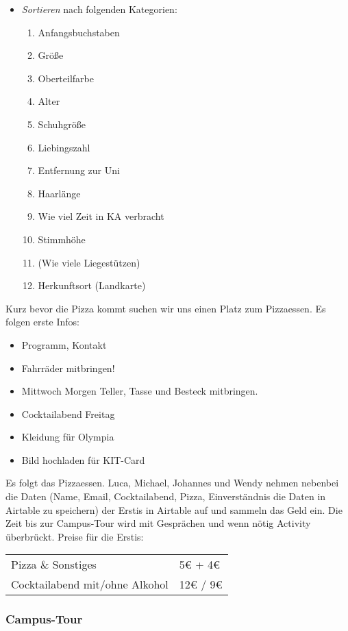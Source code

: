 \documentclass[10pt,twocolumn,ngerman]{scrartcl}
\providecommand{\tabularnewline}{\\}
\begin{document}
\begin{itemize}
    \item \emph{Sortieren} nach folgenden Kategorien:
        \begin{enumerate}
            \item Anfangsbuchstaben
            \item Größe
            \item Oberteilfarbe
            \item Alter
            \item Schuhgröße
            \item Liebingszahl
            \item Entfernung zur Uni
            \item Haarlänge
            \item Wie viel Zeit in KA verbracht
            \item Stimmhöhe
            \item (Wie viele Liegestützen)
            \item Herkunftsort (Landkarte)
        \end{enumerate}
\end{itemize}

Kurz bevor die Pizza kommt suchen wir uns einen Platz zum Pizzaessen.
Es folgen erste Infos:
\begin{itemize}
    \item Programm, Kontakt
    \item Fahrräder mitbringen!
    \item Mittwoch Morgen Teller, Tasse und Besteck mitbringen.
    \item Cocktailabend Freitag
    \item Kleidung für Olympia
    \item Bild hochladen für KIT-Card
\end{itemize}
Es folgt das Pizzaessen. Luca, Michael, Johannes und Wendy nehmen
nebenbei die Daten (Name, Email, Cocktailabend, Pizza, Einverständnis
die Daten in Airtable zu speichern) der Erstis in Airtable auf und
sammeln das Geld ein. Die Zeit bis zur Campus-Tour wird mit Gesprächen
und wenn nötig Activity überbrückt. Preise für die Erstis:

\medskip{}

\begin{tabular}{ll}
    Pizza \& Sonstiges             & 5€ + 4€\tabularnewline
    Cocktailabend mit/ohne Alkohol & 12€ / 9€\tabularnewline
\end{tabular}


\subsubsection{Campus-Tour}
\end{document}
